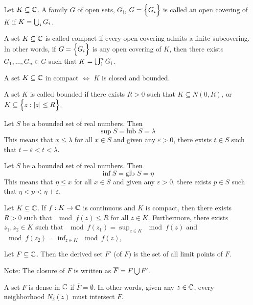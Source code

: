 \documentclass[12pt]{article}
\begin{document}
\begin{definition} Let $K \subseteq \mathbb{C}$. A family $G$ of open sets, $G_i$, $G = \Big\{ G_i \Big\}$ is called an open covering of $K$ if $K = \bigcup_i G_i$. \end{definition} 
\begin{definition} A set $K \subseteq \mathbb{C}$ is called compact if every open covering admits a finite subcovering. In other words, if $G = \Big\{ G_i \Big\}$ is any open covering of $K$, then there exists $G_1,\dots,G_n \in G$ such that $K = \bigcup_i^n G_i$. \end{definition} 
\begin{theorem} A set $K \subseteq \mathbb{C}$ in compact $\iff$ $K$ is closed and bounded. \end{theorem} 
\begin{definition} A set $K$ is called bounded if there exists $R > 0$ such that $K \subseteq N(0,R)$, or $K \subseteq \Big\{ z: \abs{z} \leq R \Big\}$. \end{definition} 
\begin{definition} Let $S$ be a bounded set of real numbers. Then $$ \sup S = \text{lub } S  = \lambda$$  This means that $x \leq \lambda$ for all $x \in S$ and given any $\varepsilon > 0$, there exists $t \in S$ such that $t - \varepsilon < t < \lambda$. \end{definition} 
\begin{definition} Let $S$ be a bounded set of real numbers. Then $$ \inf S = \text{glb } S = \eta$$ This means that $\eta \leq x$ for all $x \in S$ and given any $\varepsilon > 0$, there exists $p \in S$ such that $\eta < p < \eta + \varepsilon$. \end{definition}
\begin{theorem} Let $K \subseteq \mathbb{C}$. If $f: K \to \mathbb{C}$ is continuous and $K$ is compact, then there exists $R > 0$ such that $\mod{f(z)} \leq R $ for all $z \in K$. 
Furthermore, there exists $z_1,z_2 \in K$ such that $\mod{f(z_1)} = \sup_{z \in K} \mod{f(z)}$ and $\mod{f(z_2)} = \inf_{z\in K} \mod{f(z)}$, \end{theorem} 
\begin{definition} Let $F \subseteq \mathbb{C}$. Then the derived set $F'$ (of $F$) is the set of all limit points of $F$. \end{definition} 
Note: The closure of $F$ is written as $\overline{F} = F \bigcup F'$. 
\begin{definition} A set $F$ is dense in $\mathbb{C} $ if $\overline{F} = \emptyset$. In other words, given any $z \in \mathbb{C}$, every neighborhood $N_\delta(z)$ must intersect $F$. \end{definition} 
\end{document}
